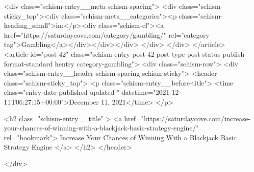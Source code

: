 {		<div class="schism-entry__meta schism-spacing">			<div class="schism-sticky_top"><div class="schism-meta__categories"><p class="schism-heading_small">in:</p><div class="schism-cl"><a href="https://saturdaycove.com/category/gambling/" rel="category tag">Gambling</a></div></div></div>		</div>
	</div>
</article>
<article id="post-42" class="schism-entry post-42 post type-post status-publish format-standard hentry category-gambling">
	<div class="schism-row">		<div class="schism-entry__header schism-spacing schism-sticky">			<header class="schism-sticky_top">				<p class="schism-entry__before-title">
					<time class="entry-date published updated " datetime="2021-12-11T06:27:15+00:00">December 11, 2021</time>				</p>

				<h2 class="schism-entry__title" >
					<a href="https://saturdaycove.com/increase-your-chances-of-winning-with-a-blackjack-basic-strategy-engine/" rel="bookmark">
						Increase Your Chances of Winning With a Blackjack Basic Strategy Engine					</a>
				</h2>
			</header>

					</div>

}
